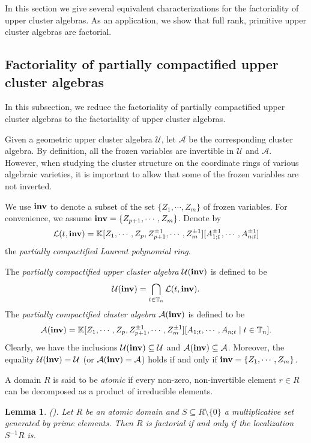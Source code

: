 \documentclass{amsart}
\newtheorem{lemma}[theorem]{Lemma}
\theoremstyle{definition}
\theoremstyle{remark}
\numberwithin{equation}{section}
\begin{document}
In this section we give several equivalent characterizations for the factoriality of upper cluster algebras.  As an application, we show that full rank, primitive upper cluster algebras are factorial.


\subsection{Factoriality of partially compactified upper cluster algebras}\label{sec:40}

In this subsection, we reduce the factoriality of partially compactified upper cluster algebras to the factoriality of upper cluster algebras. 

Given a geometric upper cluster algebra $\mathcal U$,  let $\mathcal A$ be the corresponding cluster algebra. By definition, all the frozen variables are invertible in  $\mathcal U$ and $\mathcal A$. However, when studying the cluster structure on the coordinate rings of various algebraic varieties, it is important to allow that some of the frozen variables are not inverted.



We use ${\bf inv}$ to denote a subset of the set $\{Z_1,\cdots,Z_m\}$ of frozen variables. For convenience, we assume ${\bf inv}=\{Z_{p+1},\cdots,Z_m\}$. Denote by 
$${\mathcal L}(t,{\bf inv})=\mathbb K[Z_1,\cdots,Z_p,Z_{p+1}^{\pm1},\cdots,Z_m^{\pm1}][A_{1;t}^{\pm1},\cdots,A_{n;t}^{\pm1}]$$
the {\em partially compactified Laurent
polynomial ring}.


The {\em partially compactified upper cluster algebra} $\mathcal U({\bf inv})$ is defined to be
 $$\mathcal U({\bf inv})=\bigcap\limits_{t\in\mathbb T_n} {\mathcal L}(t,{\bf inv}).$$
 The {\em partially compactified cluster algebra} $\mathcal A({\bf inv})$ is defined to be
 $$\mathcal A({\bf inv})=\mathbb K[Z_1,\cdots,Z_p,Z_{p+1}^{\pm1},\cdots,Z_m^{\pm1}][A_{1;t},\cdots,A_{n;t}\mid t\in\mathbb T_n].$$
 Clearly, we have the inclusions $\mathcal U({\bf inv})\subseteq \mathcal U$ and $\mathcal A({\bf inv})\subseteq \mathcal A$. Moreover, the equality $\mathcal U({\bf inv})=\mathcal U$ (or $\mathcal A({\bf inv})=\mathcal A$) holds if and only if ${\bf inv}=\{Z_1,\cdots,Z_m\}$.




A domain $R$ is said to be {\em atomic} if every non-zero, non-invertible element $r\in R$   can be decomposed as a product of irreducible elements.

\begin{lemma}{\rm (}\cite[Corollary 1.20]{GLS19}{\rm ).} \label{lempp2}
Let $R$ be an atomic domain and $S\subseteq R\setminus\{0\}$ a multiplicative set generated by prime elements. Then $R$ is factorial if and only if the localization $S^{-1}R$ is.
\end{lemma}
\end{document}
